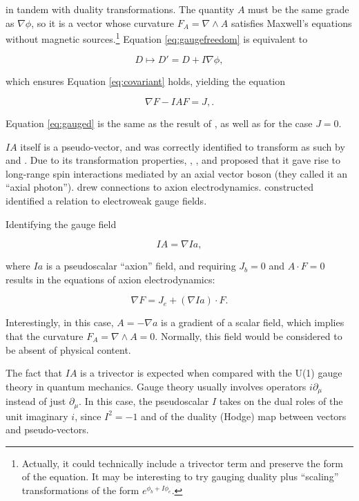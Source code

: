 \documentclass{article}
\begin{document}
  in tandem with duality transformations. The quantity $A$ must be the same grade as $\nabla \phi$, so it is a vector whose curvature $F_A = \nabla \wedge A$ satisfies Maxwell's equations without magnetic sources.\footnote{Actually, it could technically include a trivector term and preserve the form of the equation. It may be interesting to try gauging duality plus ``scaling'' transformations of the form $e^{\phi_b + I \phi_e}$.} Equation \ref{eq:gaugefreedom} is equivalent to

  \begin{equation}
    D \mapsto D' = D + I \nabla \phi,
  \end{equation}

  which ensures Equation \ref{eq:covariant} holds, yielding the equation

  \begin{equation}
    \nabla F - I A F = J,\label{eq:gauged}.
  \end{equation}

  Equation \ref{eq:gauged} is the same as the result of \cite{tiwari}, as well as \cite{malik} for the case $J=0$.

  $IA$ itself is a pseudo-vector, and was correctly identified to transform as such by \cite{malik} and \cite{tiwari}. Due to its transformation properties, \cite{malik}, \cite{naik}, and \cite{pmn} proposed that it gave rise to long-range spin interactions mediated by an axial vector boson (they called it an ``axial photon''). \cite{tiwari}  drew connections to axion electrodynamics. \cite{vasconcellos} constructed identified a relation to electroweak gauge fields.

  Identifying the gauge field

  \begin{equation}
    IA = \nabla I a,
  \end{equation}

  where $Ia$ is a pseudoscalar ``axion'' field, and requiring $J_b = 0$ and $A \cdot F = 0$ results in the equations of axion electrodynamics:

  \begin{equation}
    \nabla F = J_e + (\nabla I a) \cdot F.
  \end{equation}

  Interestingly, in this case, $A = -\nabla a$ is a gradient of a scalar field, which implies that the curvature $F_A = \nabla \wedge A = 0$. Normally, this field would be considered to be absent of physical content. 

  The fact that $IA$ is a trivector is expected when compared with the U(1) gauge theory in quantum mechanics. Gauge theory usually involves operators $i \partial_\mu$ instead of just $\partial_\mu$. In this case, the pseudoscalar $I$ takes on the dual roles of the unit imaginary $i$, since $I^2 = -1$ and of the duality (Hodge) map between vectors and pseudo-vectors.
\end{document}
